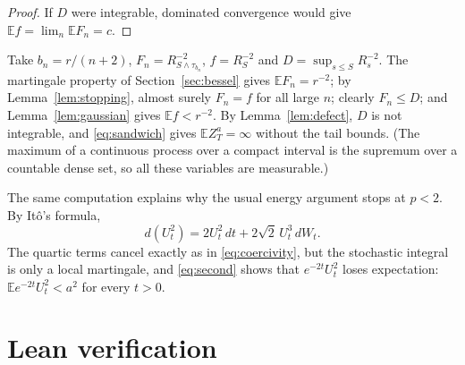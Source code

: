 \documentclass[11pt]{amsart}
\theoremstyle{remark}
\newcommand{\E}{\mathbb E}
\begin{document}
\begin{proof}
If $D$ were integrable, dominated convergence would give $\E f=\lim_n\E F_n=c$.
\end{proof}

Take $b_n=r/(n+2)$, $F_n=R_{S\wedge\tau_{b_n}}^{-2}$, $f=R_S^{-2}$ and $D=\sup_{s\le S}R_s^{-2}$. The martingale property of Section~\ref{sec:bessel} gives $\E F_n=r^{-2}$; by Lemma~\ref{lem:stopping}, almost surely $F_n=f$ for all large $n$; clearly $F_n\le D$; and Lemma~\ref{lem:gaussian} gives $\E f<r^{-2}$. By Lemma~\ref{lem:defect}, $D$ is not integrable, and \eqref{eq:sandwich} gives $\E Z_T^a=\infty$ without the tail bounds. (The maximum of a continuous process over a compact interval is the supremum over a countable dense set, so all these variables are measurable.)

The same computation explains why the usual energy argument stops at $p<2$. By It\^o's formula,
\[
 d(U_t^2)=2U_t^2\,dt+2\sqrt2\,U_t^3\,dW_t.
\]
The quartic terms cancel exactly as in \eqref{eq:coercivity}, but the stochastic integral is only a local martingale, and \eqref{eq:second} shows that $e^{-2t}U_t^2$ loses expectation: $\E e^{-2t}U_t^2<a^2$ for every $t>0$.

\section{Lean verification}\label{sec:lean}
\end{document}
